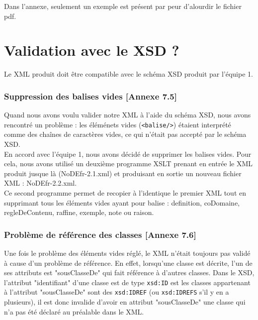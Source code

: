 \documentclass[11pt]{report}
\begin{document}
\vspace{0.5cm}
Dans l'annexe, seulement un exemple est présent par peur d'alourdir le fichier pdf.\\



\chapter{Validation avec le XSD ?}

Le XML produit doit être compatible avec le schéma XSD produit par l'équipe 1.

\subsection{Suppression des balises vides [Annexe 7.5]}

Quand nous avons voulu valider notre XML à l'aide du schéma XSD, nous avons rencontré un problème : les éléménets vides (\texttt{<balise/>}) étaient interprété comme des chaînes de caractères vides, ce qui n'était pas accepté par le schéma XSD. \\

En accord avec l'équipe 1, nous avons décidé de supprimer les balises vides. Pour cela, nous avons utilisé un deuxième programme XSLT prenant en entrée le XML produit jusque là (NoDEfr-2.1.xml) et produisant en sortie un nouveau fichier XML : NoDEfr-2.2.xml.\\

Ce second programme permet de recopier à l'identique le premier XML tout en supprimant tous les éléments vides ayant pour balise : definition, coDomaine, regleDeContenu, raffine, exemple, note ou raison.\\

\subsection{Problème de référence des classes [Annexe 7.6]}

Une fois le problème des éléments vides réglé, le XML n'était toujours pas validé à cause d'un problème de référence. En effet, lorsqu'une classe est décrite, l'un de ses attributs est "sousClasseDe" qui fait référence à d'autres classes. Dans le XSD, l'attribut "identifiant" d'une classe est de type \lstinline{xsd:ID} est les classes appartenant à l'attribut "sousClasseDe" sont des \lstinline{xsd:IDREF} (ou \lstinline{xsd:IDREFS} s'il y en a plusieurs), il est donc invalide d'avoir en attribut "sousClasseDe" une classe qui n'a pas été déclaré au préalable dans le XML. \\
\end{document}
